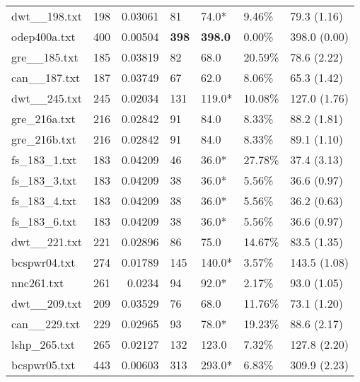 \begin{table}[h]
\begin{tabular}{lrrllll}
 dwt__198.txt       &     198 &     0.03061 & 81           & 74.0*           & 9.46\%   & 79.3 (1.16)    \\
 odep400a.txt       &     400 &     0.00504 & \textbf{398} & \textbf{398.0}  & 0.00\%   & 398.0 (0.00)   \\
 gre__185.txt       &     185 &     0.03819 & 82           & 68.0            & 20.59\%  & 78.6 (2.22)    \\
 can__187.txt       &     187 &     0.03749 & 67           & 62.0            & 8.06\%   & 65.3 (1.42)    \\
 dwt__245.txt       &     245 &     0.02034 & 131          & 119.0*          & 10.08\%  & 127.0 (1.76)   \\
 gre_216a.txt       &     216 &     0.02842 & 91           & 84.0            & 8.33\%   & 88.2 (1.81)    \\
 gre_216b.txt       &     216 &     0.02842 & 91           & 84.0            & 8.33\%   & 89.1 (1.10)    \\
 fs_183_1.txt       &     183 &     0.04209 & 46           & 36.0*           & 27.78\%  & 37.4 (3.13)    \\
 fs_183_3.txt       &     183 &     0.04209 & 38           & 36.0*           & 5.56\%   & 36.6 (0.97)    \\
 fs_183_4.txt       &     183 &     0.04209 & 38           & 36.0*           & 5.56\%   & 36.2 (0.63)    \\
 fs_183_6.txt       &     183 &     0.04209 & 38           & 36.0*           & 5.56\%   & 36.6 (0.97)    \\
 dwt__221.txt       &     221 &     0.02896 & 86           & 75.0            & 14.67\%  & 83.5 (1.35)    \\
 bcspwr04.txt       &     274 &     0.01789 & 145          & 140.0*          & 3.57\%   & 143.5 (1.08)   \\
 nnc261.txt         &     261 &     0.0234  & 94           & 92.0*           & 2.17\%   & 93.0 (1.05)    \\
 dwt__209.txt       &     209 &     0.03529 & 76           & 68.0            & 11.76\%  & 73.1 (1.20)    \\
 can__229.txt       &     229 &     0.02965 & 93           & 78.0*           & 19.23\%  & 88.6 (2.17)    \\
 lshp_265.txt       &     265 &     0.02127 & 132          & 123.0           & 7.32\%   & 127.8 (2.20)   \\
 bcspwr05.txt       &     443 &     0.00603 & 313          & 293.0*          & 6.83\%   & 309.9 (2.23)   \\

\end{tabular}
\end{table}
